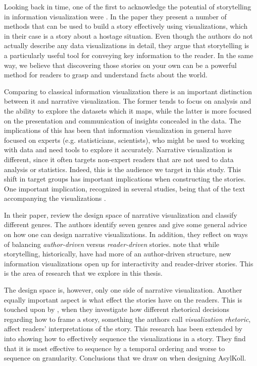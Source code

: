 \documentclass{acmtog} %
\begin{document}
Looking back in time, one of the first to acknowledge the potential of storytelling in information visualization were \citet{gershon2001storytelling}. In the paper they present a number of methods that can be used to build a story effectively using visualizations, which in their case is a story about a hostage situation. Even though the authors do not actually describe any data visualizations in detail, they argue that storytelling is a particularly useful tool for conveying key information to the reader. In the same way, we believe that discovering those stories on your own can be a powerful method for readers to grasp and understand facts about the world.

Comparing to classical information visualization there is an important distinction between it and narrative visualization. The former tends to focus on analysis and the ability to explore the datasets which it maps, while the latter is more focused on the presentation and communication of insights concealed in the data. The implications of this has been that information visualization in general have focused on experts (e.g. statisticians, scientists), who might be used to working with data and need tools to explore it accurately. Narrative visualization is different, since it often targets non-expert readers that are not used to data analysis or statistics. Indeed, this is the audience we target in this study. This shift in target groups has important implications when constructing the stories. One important implication, recognized in several studies, being that of the text accompanying the visualizations \cite{borkin2016beyond,segel2010narrative}.

In their paper, \citet{segel2010narrative} review the design space of narrative visualization and classify different genres. The authors identify seven genres and give some general advice on how one can design narrative visualizations. In addition, they reflect on ways of balancing \emph{author-driven} versus \emph{reader-driven} stories. \citet{segel2010narrative} note that while storytelling, historically, have had more of an author-driven structure, new information visualizations open up for interactivity and reader-driver stories. This is the area of research that we explore in this thesis.

The design space is, however, only one side of narrative visualization. Another equally important aspect is what effect the stories have on the readers. This is touched upon by \citet{hullman2011visualization}, when they investigate how different rhetorical decisions regarding how to frame a story, something the authors call \emph{visualization rhetoric}, affect readers' interpretations of the story. This research has been extended by \citet{hullman2013deeper} into showing how to effectively sequence the visualizations in a story. They find that it is most effective to sequence by a temporal ordering and worse to sequence on granularity. Conclusions that we draw on when designing AsylKoll.
\end{document}
